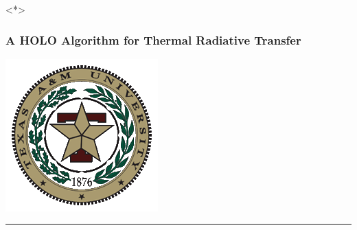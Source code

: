 \documentclass[xcolor=dvipsnames,hyperref={pdfpagelabels=false},unknownkeysallowed]{beamer}
\newcommand{\shorttitle}{\color{black} A HOLO Algorithm for Thermal Radiative Transfer
    \makebox[\linewidth]{\rule{\textwidth}{5pt}}
}
\begin{document}
\begin{frame}<*>
    \frametitle{\shorttitle}
        \vspace{0pt}
        \begin{minipage}[c][0.6\textheight]{0.2\textwidth}
            \hspace{-2em}\includegraphics[width=\textwidth]{tamu_seal.png}\hspace{1em}
            \rule[-0.3\textheight]{1pt}{0.8\textheight}
        \end{minipage}
    \vspace{0pt}
        \begin{minipage}[c][0.6\textheight]{0.74\textwidth}
\tableofcontents[
hideothersubsections,
sectionstyle=show,
subsectionstyle=hide
]
         \end{minipage}
\end{frame}
\end{document}
